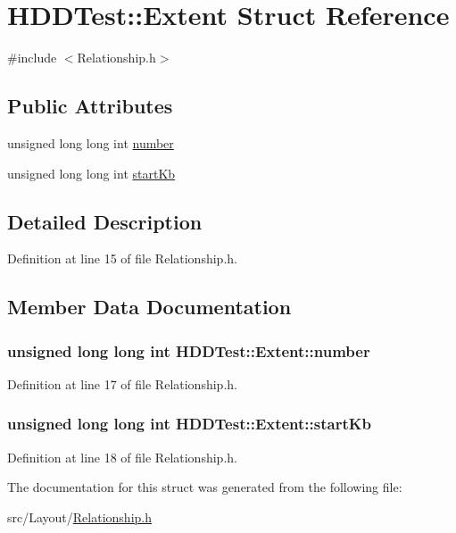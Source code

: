 \hypertarget{struct_h_d_d_test_1_1_extent}{\section{H\-D\-D\-Test\-:\-:Extent Struct Reference}
\label{struct_h_d_d_test_1_1_extent}
}


{\ttfamily \#include $<$Relationship.\-h$>$}

\subsection*{Public Attributes}
\begin{DoxyCompactItemize}
\item 
unsigned long long int \hyperlink{struct_h_d_d_test_1_1_extent_ac636e4602549d5881611e51b7f10eefd}{number}
\item 
unsigned long long int \hyperlink{struct_h_d_d_test_1_1_extent_aee160e4b0ea953d7164fb41d6a69206c}{start\-Kb}
\end{DoxyCompactItemize}


\subsection{Detailed Description}


Definition at line 15 of file Relationship.\-h.



\subsection{Member Data Documentation}
\hypertarget{struct_h_d_d_test_1_1_extent_ac636e4602549d5881611e51b7f10eefd}{
\subsubsection[{number}]{\setlength{\rightskip}{0pt plus 5cm}unsigned long long int H\-D\-D\-Test\-::\-Extent\-::number}}\label{struct_h_d_d_test_1_1_extent_ac636e4602549d5881611e51b7f10eefd}


Definition at line 17 of file Relationship.\-h.

\hypertarget{struct_h_d_d_test_1_1_extent_aee160e4b0ea953d7164fb41d6a69206c}{
\subsubsection[{start\-Kb}]{\setlength{\rightskip}{0pt plus 5cm}unsigned long long int H\-D\-D\-Test\-::\-Extent\-::start\-Kb}}\label{struct_h_d_d_test_1_1_extent_aee160e4b0ea953d7164fb41d6a69206c}


Definition at line 18 of file Relationship.\-h.



The documentation for this struct was generated from the following file\-:\begin{DoxyCompactItemize}
\item 
src/\-Layout/\hyperlink{_relationship_8h}{Relationship.\-h}\end{DoxyCompactItemize}
